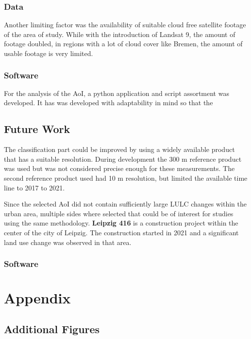 \documentclass[12pt,a4paper, english,twoside]{article}
\begin{document}
\subsubsection{Data}
Another limiting factor was the availability of suitable cloud free satellite footage of the area of study.
While with the introduction of Landsat 9, the amount of footage doubled, in regions with a lot of cloud cover like Bremen, the amount of usable footage is very limited.

\subsubsection{Software}
For the analysis of the \gls{AoI}, a python application and script assortment was developed. 
It has was developed with adaptability in mind so that the 


% 
\subsection{Future Work}

The classification part could be improved by using a widely available product that has a suitable resolution. 
During development the 300 m reference product~\cite{sec:references} was used but was not considered precise enough for these measurements.
The second reference product used had 10 m resolution, but limited the available time line to 2017 to 2021.

Since the selected \gls{AoI} did not contain sufficiently large \gls{LULC} changes within the urban area, multiple sides where selected that could be of interest for studies using the same methodology.
\textbf{Leipzig 416} is a construction project within the center of the city of Leipzig.
The construction started in 2021 and a significant land use change was observed in that area. 






\subsubsection{Software}


\newpage
\section{Appendix}
  \subsection{Additional Figures}
  \missingfigure{}
\end{document}
